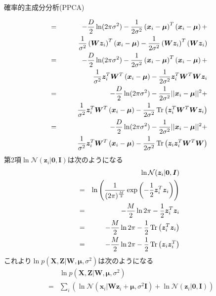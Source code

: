 \documentclass[dvipdfmx,notheorems,t]{beamer}
\begin{document}
\begin{frame}{確率的主成分分析(PPCA)}
\begin{itemize}
\begin{itemize}
\begin{eqnarray}
			&=& -\frac{D}{2} \ln (2\pi \sigma^2) - \frac{1}{2 \sigma^2} \left( \bm{x}_i - \bm{\mu} \right)^T \left( \bm{x}_i - \bm{\mu} \right) + \nonumber \\
			&& \qquad \frac{1}{\sigma^2} \left( \bm{W} \bm{z}_i \right)^T \left( \bm{x}_i - \bm{\mu} \right) - \frac{1}{2 \sigma^2} \left( \bm{W} \bm{z}_i \right)^T \left( \bm{W} \bm{z}_i \right) \nonumber \\
			&=& -\frac{D}{2} \ln (2\pi \sigma^2) - \frac{1}{2 \sigma^2} \left( \bm{x}_i - \bm{\mu} \right)^T \left( \bm{x}_i - \bm{\mu} \right) + \nonumber \\
			&& \qquad \frac{1}{\sigma^2} \bm{z}_i^T \bm{W}^T \left( \bm{x}_i - \bm{\mu} \right) - \frac{1}{2 \sigma^2} \bm{z}_i^T \bm{W}^T \bm{W} \bm{z}_i \nonumber \\
			&=& -\frac{D}{2} \ln (2\pi \sigma^2) - \frac{1}{2 \sigma^2} || \bm{x}_i - \bm{\mu} ||^2 + \nonumber \\
			&& \qquad \frac{1}{\sigma^2} \bm{z}_i^T \bm{W}^T \left( \bm{x}_i - \bm{\mu} \right) - \frac{1}{2 \sigma^2} \operatorname{Tr} \left( \bm{z}_i^T \bm{W}^T \bm{W} \bm{z}_i \right) \nonumber \\
			&=& -\frac{D}{2} \ln (2\pi \sigma^2) - \frac{1}{2 \sigma^2} || \bm{x}_i - \bm{\mu} ||^2 + \nonumber \\
			&& \qquad \frac{1}{\sigma^2} \bm{z}_i^T \bm{W}^T \left( \bm{x}_i - \bm{\mu} \right) - \frac{1}{2 \sigma^2} \operatorname{Tr} \left( \bm{z}_i \bm{z}_i^T \bm{W}^T \bm{W} \right)
		\end{eqnarray}
		第2項$\ln \mathcal{N}(\bm{z}_i | \bm{0}, \bm{I})$は次のようになる
		\begin{eqnarray}
			&& \ln \mathcal{N}(\bm{z}_i | \bm{0}, \bm{I}) \nonumber \\
			&=& \ln \left( \frac{1}{(2\pi)^\frac{M}{2}} \exp \left( -\frac{1}{2} \bm{z}_i^T \bm{z}_i \right) \right) \nonumber \\
			&=& -\frac{M}{2} \ln 2\pi - \frac{1}{2} \bm{z}_i^T \bm{z}_i \nonumber \\
			&=& -\frac{M}{2} \ln 2\pi - \frac{1}{2} \operatorname{Tr} \left( \bm{z}_i^T \bm{z}_i \right) \nonumber \\
			&=& -\frac{M}{2} \ln 2\pi - \frac{1}{2} \operatorname{Tr} \left( \bm{z}_i \bm{z}_i^T \right)
		\end{eqnarray}
		これより$\ln p(\bm{X}, \bm{Z} | \bm{W}, \bm{\mu}, \sigma^2)$は次のようになる
		\begin{eqnarray}
			&& \ln p(\bm{X}, \bm{Z} | \bm{W}, \bm{\mu}, \sigma^2) \nonumber \\
			&=& \sum_i \left( \ln \mathcal{N}(\bm{x}_i | \bm{W} \bm{z}_i + \bm{\mu}, \sigma^2 \bm{I}) + \ln \mathcal{N}(\bm{z}_i | \bm{0}, \bm{I}) \right) \nonumber \\

\end{eqnarray}
\end{itemize}
\end{itemize}
\end{frame}
\end{document}
